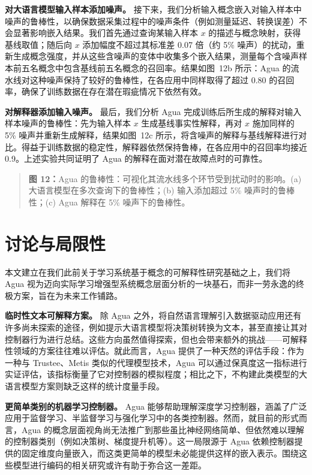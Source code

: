 \documentclass[11pt,a4paper]{article}
\begin{document}
\textbf{对大语言模型输入样本添加噪声。} 接下来，我们分析输入概念嵌入对输入样本中噪声的鲁棒性，以确保数据采集过程中的噪声条件（例如测量延迟、转换误差）不会显著影响嵌入结果。我们首先通过查询某输入样本 $x$ 的描述与概念映射，获得基线取值；随后向 $x$ 添加幅度不超过其标准差 0.07 倍（约 5\% 噪声）的扰动，重新生成概念强度，并从这些含噪声的变体中收集多个嵌入结果，测量每个含噪声样本前五名概念中包含基线前五名概念的召回率。结果如图~12b 所示：Agua 的流水线对这种噪声保持了较好的鲁棒性，在各应用中同样取得了超过 0.80 的召回率，确保了训练数据在存在潜在瑕疵情况下依然有效。

\textbf{对解释器添加输入噪声。} 最后，我们分析 Agua 完成训练后所生成的解释对输入样本噪声的鲁棒性：先为输入样本 $x$ 生成基线事实性解释，再对 $x$ 施加同样的 5\% 噪声并重新生成解释，结果如图~12c 所示，将含噪声的解释与基线解释进行对比。得益于训练数据的稳定性，解释器依然保持鲁棒，在各应用中的召回率均接近 0.9。上述实验共同证明了 Agua 的解释在面对潜在故障点时的可靠性。

\begin{quote}\small\noindent\textbf{图 12：}Agua 的鲁棒性：可视化其流水线多个环节受到扰动时的影响。(a) 大语言模型在多次查询下的鲁棒性；(b) 输入添加超过 5\% 噪声时的鲁棒性；(c) Agua 解释在 5\% 噪声下的鲁棒性。\end{quote}

\section{讨论与局限性}

本文建立在我们此前关于学习系统基于概念的可解释性研究基础之上，我们将 Agua 视为迈向实际学习增强型系统概念层面分析的一块基石，而非一劳永逸的终极方案，旨在为未来工作铺路。

\textbf{临时性文本可解释方案。} 除 Agua 之外，将自然语言理解引入数据驱动应用还有许多尚未探索的途径，例如提示大语言模型将决策树转换为文本，甚至直接让其对控制器行为进行总结。这些方向虽然值得探索，但也会带来额外的挑战——可解释性领域的方案往往难以评估。就此而言，Agua 提供了一种天然的评估手段：作为一种与 Trustee、Metis 类似的代理模型技术，Agua 可以通过保真度这一指标进行实证评估，该指标衡量了它对控制器的模拟程度；相比之下，不构建此类模型的大语言模型方案则缺乏这样的统计度量手段。

\textbf{更简单类别的机器学习控制器。} Agua 能够帮助理解深度学习控制器，涵盖了广泛应用于监督学习、半监督学习与强化学习中的各类控制器。然而，就目前的形式而言，Agua 的概念层面视角尚无法推广到那些虽比神经网络简单、但依然难以理解的控制器类别（例如决策树、梯度提升机等）。这一局限源于 Agua 依赖控制器提供的固定维度向量嵌入，而这类更简单的模型未必能提供这样的嵌入表示。围绕这些模型进行编码的相关研究或许有助于弥合这一差距。
\end{document}
